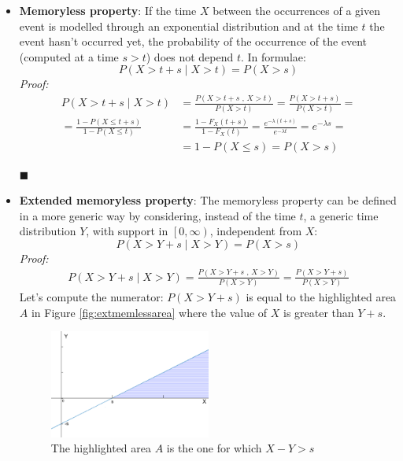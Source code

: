 \documentclass[12pt,a4paper]{article}
\begin{document}
\begin{itemize}
\item \textbf{Memoryless property}: 
If the time $X$ between the occurrences of a given event is modelled through an exponential distribution and at the time $t$ the event hasn't occurred yet, the probability of the occurrence of the event (computed at a time $s>t$) does not depend $t$. In formulae:
$$
P(X>t+s \mid X>t)= P(X>s)
$$
\emph{Proof:}
\begin{equation*}
\begin{split}
P(X>t+s \mid X>t) &= \frac{P(X>t+s \textrm{ , } X>t)}{P(X>t)} = \frac{P(X>t+s)}{P(X>t)}= \\
= \frac{1-P(X\leq t+s)}{1-P(X\leq t)} &=\frac{1-F_X(t+s)}{1-F_X(t)} = \frac{e^{-\lambda (t+s)}}{e^{-\lambda t}} = e^{-\lambda s} = \\
&= 1 - P(X \leq s) = P(X>s)
\end{split}
\end{equation*}
\begin{flushright}
$\blacksquare$
\end{flushright}
\item \textbf{Extended memoryless property}:
The memoryless property can be defined in a more generic way by considering, instead of the time $t$, a generic time distribution $Y$, with support in $\left[0,\infty \right)$, independent from $X$:
$$
P(X>Y+s \mid X>Y)=P(X>s)
$$
\emph{Proof:}
\begin{equation*}
\begin{split}
P(X>Y+s \mid X>Y) = \frac{P(X>Y+s \textrm{ , } X>Y)}{P(X>Y)} = \frac{P(X>Y+s)}{P(X>Y)} 
\end{split}
\end{equation*}
Let's compute the numerator: $P(X>Y+s)$ is equal to the highlighted area $A$ in Figure \ref{fig:extmemlessarea} where the value of $X$ is greater than $Y+s$.
\begin{figure}[H]
\begin{center}
\includegraphics[width=0.5\textwidth]{IMG/CommArea.eps}
\caption{The highlighted area $A$ is the one for which $X-Y>s$}

\end{center}
\end{figure}
\end{itemize}
\end{document}
